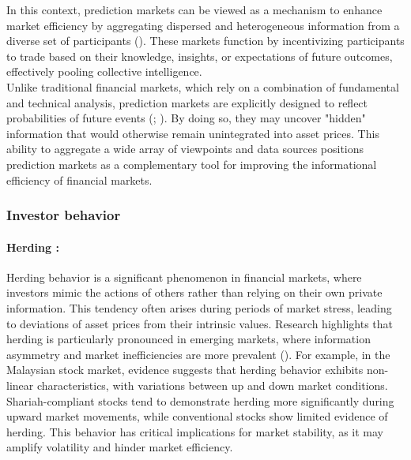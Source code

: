\documentclass[12pt]{report}
\begin{document}
In this context, prediction markets can be viewed as a mechanism to enhance market efficiency by aggregating dispersed and heterogeneous information from a diverse set of participants (\cite{downey_efficient_2024}). These markets function by incentivizing participants to trade based on their knowledge, insights, or expectations of future outcomes, effectively pooling collective intelligence.\\

Unlike traditional financial markets, which rely on a combination of fundamental and technical analysis, prediction markets are explicitly designed to reflect probabilities of future events (\cite{nti_systematic_2020}; \cite{naseer_efficient_2016}). By doing so, they may uncover "hidden" information that would otherwise remain unintegrated into asset prices. This ability to aggregate a wide array of viewpoints and data sources positions prediction markets as a complementary tool for improving the informational efficiency of financial markets.

\subsubsection{Investor behavior}

\paragraph{Herding :}Herding behavior is a significant phenomenon in financial markets, where investors mimic the actions of others rather than relying on their own private information. This tendency often arises during periods of market stress, leading to deviations of asset prices from their intrinsic values. Research highlights that herding is particularly pronounced in emerging markets, where information asymmetry and market inefficiencies are more prevalent (\cite{ah_mand_herding_2023}). For example, in the Malaysian stock market, evidence suggests that herding behavior exhibits non-linear characteristics, with variations between up and down market conditions. Shariah-compliant stocks tend to demonstrate herding more significantly during upward market movements, while conventional stocks show limited evidence of herding. This behavior has critical implications for market stability, as it may amplify volatility and hinder market efficiency.
\end{document}
